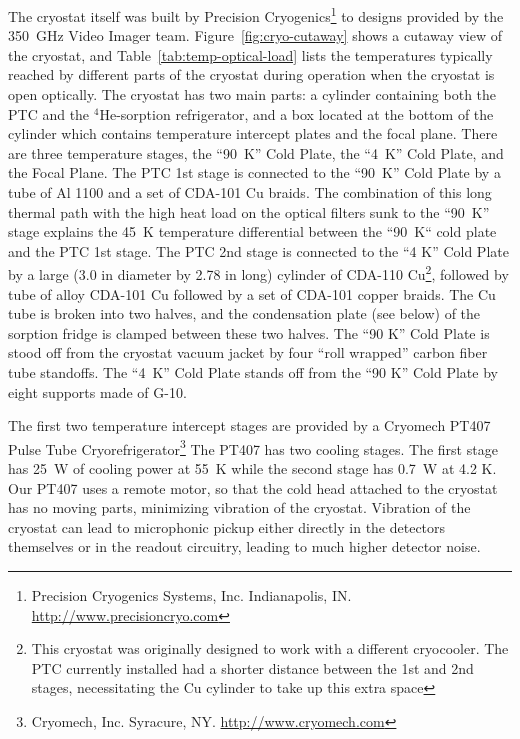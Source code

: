 \documentclass[10pt,twocolumn,article]{memoir}
\newcommand*{\figref}[1]{Figure~\ref{#1}}
\newcommand*{\tableref}[1]{Table~\ref{#1}}
\newcommand*{\He}[1]{$^{#1}$He\xspace}
\newcommand*{\Imager}{350~GHz Video Imager\xspace}
\begin{document}
The cryostat itself was built by Precision Cryogenics\footnote{Precision Cryogenics Systems, Inc. Indianapolis, IN. \url{http://www.precisioncryo.com}} to designs provided by the \Imager team.
\figref{fig:cryo-cutaway} shows a cutaway view of the cryostat, and \tableref{tab:temp-optical-load} lists the temperatures typically reached by different parts of the cryostat during operation when the cryostat is open optically.
The cryostat has two main parts: a cylinder containing both the PTC and the \He4-sorption refrigerator, and a box located at the bottom of the cylinder which contains temperature intercept plates and the focal plane.
There are three temperature stages, the ``90~K'' Cold Plate, the ``4~K'' Cold Plate, and the Focal Plane.
The PTC 1st stage is connected to the ``90~K'' Cold Plate by a tube of Al 1100 and a set of CDA-101 Cu braids.
The combination of this long thermal path with the high heat load on the optical filters sunk to the ``90~K'' stage explains the 45~K temperature differential between the ``90~K`` cold plate and the PTC 1st stage.
The PTC 2nd stage is connected to the ``4 K'' Cold Plate by a large (3.0 in diameter by 2.78 in long) cylinder of CDA-110 Cu\footnote{This cryostat was originally designed to work with a different cryocooler. The PTC currently installed had a shorter distance between the 1st and 2nd stages, necessitating the Cu cylinder to take up this extra space}, followed by tube of alloy CDA-101 Cu followed by a set of  CDA-101 copper braids.
The Cu tube is broken into two halves, and the condensation plate (see below) of the sorption fridge is clamped between these two halves. The ``90 K'' Cold Plate is stood off from the cryostat vacuum jacket by four ``roll wrapped'' carbon fiber tube standoffs. The ``4~K'' Cold Plate stands off from the ``90 K'' Cold Plate by eight supports made of G-10.

The first two temperature intercept stages are provided by a Cryomech PT407 Pulse Tube Cryorefrigerator\footnote{Cryomech, Inc. Syracure, NY. \url{http://www.cryomech.com}}
The PT407 has two cooling stages.
The first stage has 25~W of cooling power at 55~K while the second stage has 0.7~W at 4.2 K.
Our PT407 uses a remote motor, so that the cold head attached to the cryostat has no moving parts, minimizing vibration of the cryostat.
Vibration of the cryostat can lead to microphonic pickup either directly in the detectors themselves or in the readout circuitry, leading to much higher detector noise.
\end{document}
